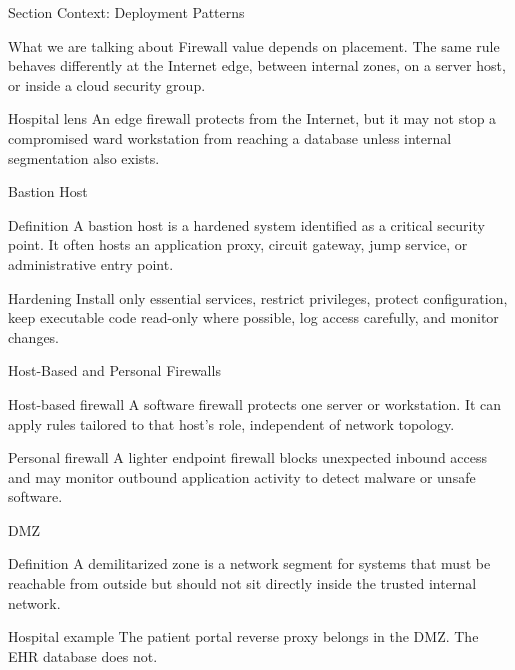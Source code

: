 \documentclass[presentation]{beamer}
\begin{document}
\begin{frame}[c]{Section Context: Deployment Patterns}
\begin{block}{What we are talking about}
Firewall value depends on placement. The same rule behaves differently at the Internet edge, between
internal zones, on a server host, or inside a cloud security group.
\end{block}

\begin{exampleblock}{Hospital lens}
An edge firewall protects from the Internet, but it may not stop a compromised ward workstation from
reaching a database unless internal segmentation also exists.
\end{exampleblock}
\end{frame}

\begin{frame}[c]{Bastion Host}
\begin{block}{Definition}
A bastion host is a hardened system identified as a critical security point. It often hosts an
application proxy, circuit gateway, jump service, or administrative entry point.
\end{block}

\begin{block}{Hardening}
Install only essential services, restrict privileges, protect configuration, keep executable code
read-only where possible, log access carefully, and monitor changes.
\end{block}
\end{frame}

\begin{frame}[c]{Host-Based and Personal Firewalls}
\begin{block}{Host-based firewall}
A software firewall protects one server or workstation. It can apply rules tailored to that host's
role, independent of network topology.
\end{block}

\begin{block}{Personal firewall}
A lighter endpoint firewall blocks unexpected inbound access and may monitor outbound application
activity to detect malware or unsafe software.
\end{block}
\end{frame}

\begin{frame}[c]{DMZ}
\begin{block}{Definition}
A demilitarized zone is a network segment for systems that must be reachable from outside but should
not sit directly inside the trusted internal network.
\end{block}

\begin{exampleblock}{Hospital example}
The patient portal reverse proxy belongs in the DMZ. The EHR database does not.
\end{exampleblock}
\end{frame}
\end{document}
